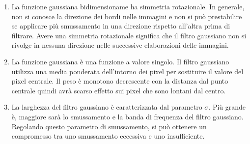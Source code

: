 \documentclass[../main.tex]{subfiles}
\begin{document}
\begin{enumerate}
	\itemsep0em
	\item La funzione gaussiana bidimensioname ha simmetria rotazionale. In generale, non si conosce la direzione dei bordi nelle immagini e non si può prestabilire se applicare più smussamento in una direzione rispetto all'altra prima di filtrare. Avere una simmetria rotazionale significa che il filtro gaussiano non si rivolge in nessuna direzione nelle successive elaborazioni delle immagini.
	\item La funzione gaussiana è una funzione a valore singolo. Il filtro gaussiano utilizza una media ponderata dell'intorno dei pixel per sostituire il valore del pixel centrale. Il peso è monotono decrescente con la distanza dal punto centrale quindi avrà scarso effetto sui pixel che sono lontani dal centro.
	\item La larghezza del filtro gaussiano è caratterizzata dal parametro $\sigma$. Più grande è, maggiore sarà lo smussamento e la banda di frequenza del filtro gaussiano. Regolando questo parametro di smussamento, si può ottenere un compromesso tra uno smussamento eccessiva e uno insufficiente.\\[-10pt]
	

\end{enumerate}
\end{document}
